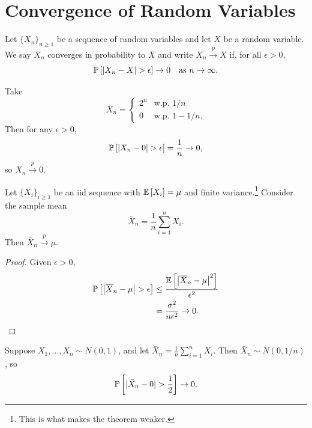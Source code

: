 
\section{Convergence of Random Variables}

\begin{definition}
	Let $\{X_n\}_{n\ge 1}$ be a sequence of random variables and let $X$ be a random variable. We say $X_n$ converges in probability to $X$ and write $X_n \xrightarrow{p} X$ if, for all $\epsilon>0$,
	\[
		\P\left[|X_n-X|>\epsilon\right]\to 0\quad\text{as }n\to\infty.
	\]
\end{definition}

\begin{example}	Take
	\[
		X_n=\begin{cases}
			2^n & \text{w.p. }1/n    \\
			0   & \text{w.p. }1-1/n.
		\end{cases}
	\]
	Then for any $\epsilon>0$,
	\[
		\P\left[|X_n-0|>\epsilon\right]=\frac{1}{n}\to 0,
	\]
	so $X_n\xrightarrow{p}0$.
\end{example}

\begin{theorem}
	Let $\{X_i\}_{i\ge 1}$ be an iid sequence with $\mathbb{E}\left[X_i\right]=\mu$ and finite variance.\footnote{This is what makes the theorem weaker.} Consider the sample mean
	\[
		\bar X_n=\frac{1}{n}\sum_{i=1}^n X_i.
	\]
	Then $\bar X_n\xrightarrow{p}\mu$.
\end{theorem}

\begin{proof}
	Given $\epsilon > 0$,
	\begin{align*}
		\mathbb{P}\left[\left| \overline{X}_n - \mu \right| > \epsilon\right] & \le \frac{\mathbb{E}\left[\left| \overline{X}_n - \mu \right|^2\right] }{\epsilon^2} \\
		                                                              & = \frac{\sigma^2}{n\epsilon^2} \to 0
		.\end{align*}
\end{proof}

\begin{example}	Suppose $X_1,\dots,X_n\sim N(0,1)$, and let $\bar X_n=\frac{1}{n}\sum_{i=1}^n X_i$. Then $\bar X_n\sim N(0,1/n)$, so
	\[
		\P\left[|\bar X_n-0|>\frac{1}{2}\right]\to 0.
	\]
\end{example}

